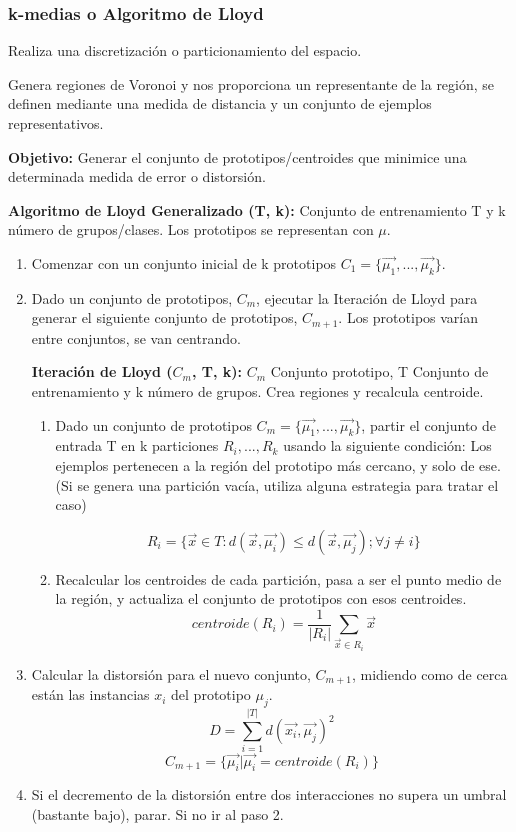 \documentclass[12pt, twoside, openright]{report} %
\begin{document}
\subsubsection{k-medias o Algoritmo de Lloyd}

Realiza una discretización o particionamiento del espacio.

Genera regiones de Voronoi y nos proporciona un representante de la región, se definen mediante una medida de distancia y un conjunto de ejemplos representativos.

\textbf{Objetivo:} Generar el conjunto de prototipos/centroides que minimice una determinada medida de error o distorsión.


\textbf{Algoritmo de Lloyd Generalizado (T, k):} Conjunto de entrenamiento T y k número de grupos/clases. Los prototipos se representan con $\mu$.

\begin{enumerate}
	\item Comenzar con un conjunto inicial de k prototipos $C_1 = \{\vec{\mu_1}, ..., \vec{\mu_k} \}$.
	\item Dado un conjunto de prototipos, $C_m$, ejecutar la Iteración de Lloyd para generar el siguiente conjunto de prototipos, $C_{m+1}$. Los prototipos varían entre conjuntos, se van centrando.

	      \textbf{Iteración de Lloyd ($C_m$, T, k):} $C_m$ Conjunto prototipo, T Conjunto de entrenamiento y k número de grupos. Crea regiones y recalcula centroide.
	      \begin{enumerate}
		      \item Dado un conjunto de prototipos $C_m = \{\vec{\mu_1}, ..., \vec{\mu_k} \}$, partir el conjunto de entrada T en k particiones $R_i, ..., R_k$ usando la siguiente condición: Los ejemplos pertenecen a la región del prototipo más cercano, y solo de ese. (Si se genera una partición vacía, utiliza alguna estrategia para tratar el caso)

		            $$R_i = \{ \vec{x} \in T: d(\vec{x}, \vec{\mu_i}) \leq d(\vec{x}, \vec{\mu_j}); \forall j \neq i \}$$
		      \item Recalcular los centroides de cada partición, pasa a ser el punto medio de la región, y actualiza el conjunto de prototipos con esos centroides.
		            $$centroide(R_i) = \frac{1}{|R_i|} \sum_{\vec{x} \in R_i} \vec{x}$$
	      \end{enumerate}
	\item Calcular la distorsión para el nuevo conjunto, $C_{m+1}$, midiendo como de cerca están las instancias $x_i$ del prototipo $\mu_j$.
	      $$D = \sum^{|T|}_{i=1} d( \vec{x_i}, \vec{\mu_j})^2$$
	      $$C_{m+1} = \{\vec{\mu_i}|\vec{\mu_i} = centroide(R_i) \}$$
	\item Si el decremento de la distorsión entre dos interacciones no supera un umbral (bastante bajo), parar. Si no ir al paso 2.
\end{enumerate}
\end{document}
